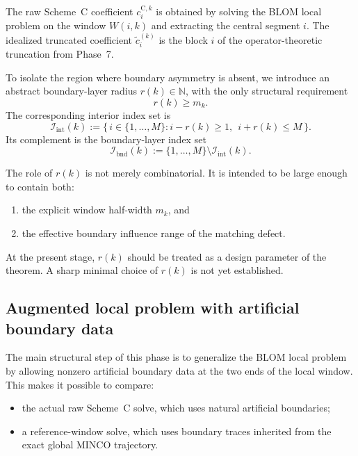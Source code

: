 The raw Scheme~C coefficient \(c_i^{\mathrm{C},k}\) is obtained by solving the BLOM local problem on the window \(W(i,k)\) and extracting the central segment \(i\).
The idealized truncated coefficient \(\tilde c_i^{(k)}\) is the block \(i\) of the operator-theoretic truncation from Phase~7.

To isolate the region where boundary asymmetry is absent, we introduce an abstract boundary-layer radius \(r(k)\in\mathbb N\), with the only structural requirement
\begin{equation}
\label{eq:phase8_radius_requirement}
r(k)\ge m_k.
\end{equation}
The corresponding interior index set is
\begin{equation}
\label{eq:phase8_interior_set}
\mathcal I_{\mathrm{int}}(k)
:=
\{\, i\in\{1,\dots,M\}: i-r(k)\ge 1,\ \ i+r(k)\le M \,\}.
\end{equation}
Its complement is the boundary-layer index set
\begin{equation}
\label{eq:phase8_boundary_set}
\mathcal I_{\mathrm{bnd}}(k)
:=
\{1,\dots,M\}\setminus \mathcal I_{\mathrm{int}}(k).
\end{equation}

\begin{remark}
\label{rem:phase8_radius_choice}
The role of \(r(k)\) is not merely combinatorial.
It is intended to be large enough to contain both:
\begin{enumerate}
    \item the explicit window half-width \(m_k\), and
    \item the effective boundary influence range of the matching defect.
\end{enumerate}
At the present stage, \(r(k)\) should be treated as a design parameter of the theorem.
A sharp minimal choice of \(r(k)\) is not yet established.
\end{remark}

\subsection{Augmented local problem with artificial boundary data}
\label{subsec:phase8_augmented_local_problem}

The main structural step of this phase is to generalize the BLOM local problem by allowing nonzero artificial boundary data at the two ends of the local window.
This makes it possible to compare:
\begin{itemize}
    \item the actual raw Scheme~C solve, which uses natural artificial boundaries;
    \item a reference-window solve, which uses boundary traces inherited from the exact global MINCO trajectory.
\end{itemize}

